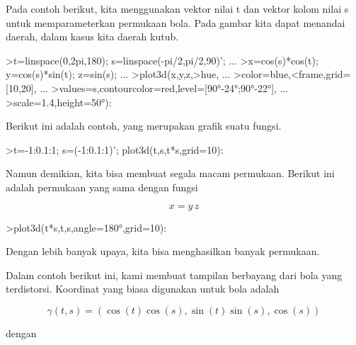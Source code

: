 \documentclass[a4paper,10pt]{article}
\begin{document}
\begin{eulernotebook}
\begin{eulercomment}
\begin{eulercomment}
\begin{eulercomment}
\begin{eulercomment}
\begin{eulercomment}
\begin{eulercomment}
\begin{eulercomment}
\begin{eulercomment}
\begin{eulercomment}
\begin{eulercomment}
\begin{eulercomment}
\begin{eulercomment}
\begin{eulercomment}
\begin{eulercomment}
\begin{eulercomment}
\begin{eulercomment}
\begin{eulercomment}
Pada contoh berikut, kita menggunakan vektor nilai t dan vektor kolom
nilai s untuk memparameterkan permukaan bola. Pada gambar kita dapat
menandai daerah, dalam kasus kita daerah kutub.
\end{eulercomment}
\begin{eulerprompt}
>t=linspace(0,2pi,180); s=linspace(-pi/2,pi/2,90)'; ...
>x=cos(s)*cos(t); y=cos(s)*sin(t); z=sin(s); ...
>plot3d(x,y,z,>hue, ...
>color=blue,<frame,grid=[10,20], ...
>values=s,contourcolor=red,level=[90°-24°;90°-22°], ...
>scale=1.4,height=50°):
\end{eulerprompt}
\begin{eulercomment}
Berikut ini adalah contoh, yang merupakan grafik suatu fungsi.
\end{eulercomment}
\begin{eulerprompt}
>t=-1:0.1:1; s=(-1:0.1:1)'; plot3d(t,s,t*s,grid=10):
\end{eulerprompt}
\begin{eulercomment}
Namun demikian, kita bisa membuat segala macam permukaan. Berikut ini
adalah permukaan yang sama dengan fungsi

\end{eulercomment}
\begin{eulerformula}
\[
x = y \, z
\]
\end{eulerformula}
\begin{eulerprompt}
>plot3d(t*s,t,s,angle=180°,grid=10):
\end{eulerprompt}
\begin{eulercomment}
Dengan lebih banyak upaya, kita bisa menghasilkan banyak permukaan.

Dalam contoh berikut ini, kami membuat tampilan berbayang dari bola
yang terdistorsi. Koordinat yang biasa digunakan untuk bola adalah

\end{eulercomment}
\begin{eulerformula}
\[
\gamma(t,s) = (\cos(t)\cos(s),\sin(t)\sin(s),\cos(s))
\]
\end{eulerformula}
\begin{eulercomment}
dengan


\end{eulercomment}
\end{eulercomment}
\end{eulercomment}
\end{eulercomment}
\end{eulercomment}
\end{eulercomment}
\end{eulercomment}
\end{eulercomment}
\end{eulercomment}
\end{eulercomment}
\end{eulercomment}
\end{eulercomment}
\end{eulercomment}
\end{eulercomment}
\end{eulercomment}
\end{eulercomment}
\end{eulercomment}
\end{eulernotebook}
\end{document}
